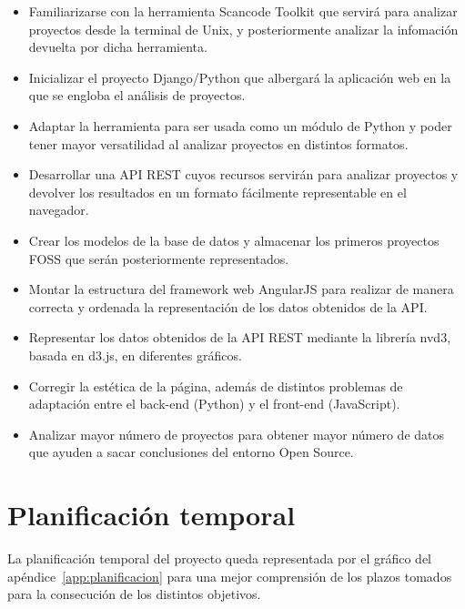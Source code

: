 \documentclass[a4paper, spanish, 12pt]{book}
\begin{document}
\begin{itemize}

\item Familiarizarse con la herramienta Scancode Toolkit que servir\'a para
analizar proyectos desde la terminal de Unix, y posteriormente analizar la
infomaci\'on devuelta por dicha herramienta.

\item Inicializar el proyecto Django/Python que albergar\'a la aplicaci\'on
web en la que se engloba el an\'alisis de proyectos.

\item Adaptar la herramienta para ser usada como un m\'odulo de Python
y poder tener mayor versatilidad al analizar proyectos en distintos formatos.

\item Desarrollar una API REST cuyos recursos servir\'an para analizar proyectos
y devolver los resultados en un formato f\'acilmente representable en el navegador.

\item Crear los modelos de la base de datos y almacenar los
primeros proyectos FOSS que ser\'an posteriormente representados.

\item Montar la estructura del framework web AngularJS para realizar de manera
correcta y ordenada la representaci\'on de los datos obtenidos de la API.

\item Representar los datos obtenidos de la API REST mediante la librer\'ia
nvd3, basada en d3.js, en diferentes gr\'aficos.

\item Corregir la est\'etica de la p\'agina, adem\'as de distintos problemas de
adaptaci\'on entre el back-end (Python) y el front-end (JavaScript).

\item Analizar mayor n\'umero de proyectos para obtener mayor n\'umero de datos
que ayuden a sacar conclusiones del entorno Open Source.

\end{itemize}

\section{Planificaci\'on temporal}
\label{sec:planificacion-temporal}

La planificaci\'on temporal del proyecto queda representada por el gr\'afico del
ap\'endice~\ref{app:planificacion} para una mejor comprensi\'on de los plazos tomados para la consecuci\'on
de los distintos objetivos.
\end{document}
